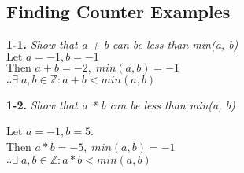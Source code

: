 \subsection*{Finding Counter Examples}

\textbf{1-1.} \emph{Show that a + b can be less than min(a, b)} \\
%
\textcolor{answer}{\hspace{\parindent} $\text{Let } a = -1, b = -1$ \\}
\textcolor{answer}{\hspace{\parindent} $\text{Then } a + b = -2, \; min(a,b) = -1$ \\}
\textcolor{answer}{\hspace{\parindent} $\therefore \exists \; a, b \in \mathbb{Z} : a+b < min(a,b)$ \\}



\textbf{1-2.} \emph{Show that a * b can be less than min(a, b)}
  \begin{center}
  \textcolor{answer}{
	  Let $a = -1, b = 5$. \\
	  Then $a*b = -5, \; min(a,b) = -1$\\
	  $\therefore \exists \; a, b \in \mathbb{Z} : a*b < min(a,b)$
  }
  \end{center}





